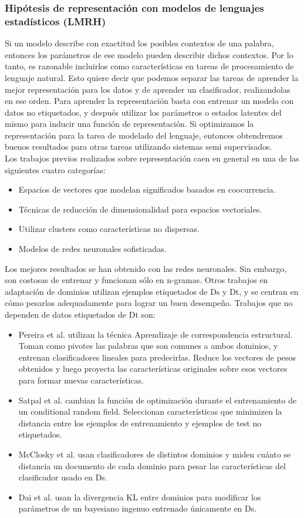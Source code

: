 \documentclass[11pt,spanish]{article}
\begin{document}
\subsubsection{Hipótesis de representación con modelos de lenguajes estadísticos (LMRH)}
Si un modelo describe con exactitud los posibles contextos de una palabra, entonces los parámetros de ese modelo pueden describir dichos contextos. Por lo tanto, es razonable incluirlos como características en tareas de procesamiento de lenguaje natural.
Esto quiere decir que podemos separar las tareas de aprender la mejor representación para los datos y de aprender un clasificador, realizandolas en ese orden. Para aprender la representación basta con entrenar un modelo con datos no etiquetados, y después utilizar los parámetros o estados latentes del mismo para inducir una función de representación. Si optimizamos la representación para la tarea de modelado del lenguaje, entonces obtendremos buenos resultados para otras tareas utilizando sistemas semi supervisados.
\\
Los trabajos previos realizados sobre representación caen en general en una de las siguientes cuatro categorías:
\begin{itemize}
    \item Espacios de vectores que modelan significados basados en coocurrencia.
    \item Técnicas de reducción de dimensionalidad para espacios vectoriales.
    \item Utilizar clusters como características no dispersas.
    \item Modelos de redes neuronales sofisticadas.
\end{itemize}
Los mejores resultados se han obtenido con las redes neuronales. Sin embargo, son costosas de entrenar y funcionan sólo en n-gramas.
Otros trabajos en adaptación de dominios utilizan ejemplos etiquetados de Ds y Dt, y se centran en cómo pesarlos adequadamente para lograr un buen desempeño. Trabajos que no dependen de datos etiquetados de Dt son:
\begin{itemize}
    \item Pereira et al. utilizan la técnica Aprendizaje de correspondencia estructural. Toman como pivotes las palabras que son comunes a ambos dominios, y entrenan clasificadores lineales para predecirlas. Reduce los vectores de pesos obtenidos y luego proyecta las características originales sobre esos vectores para formar nuevas características.
    \item Satpal et al. cambian la función de optimización durante el entrenamiento de un conditional random field. Seleccionan características que minimizen la distancia entre los ejemplos de entrenamiento y ejemplos de test no etiquetados.
    \item McClosky et al. usan clasificadores de distintos dominios y miden cuánto se distancia un documento de cada dominio para pesar las características del clasificador usado en Ds.
    \item Dai et al. usan la divergencia KL entre dominios para modificar los parámetros de un bayesiano ingenuo entrenado únicamente en Ds.
\end{itemize}
\end{document}
